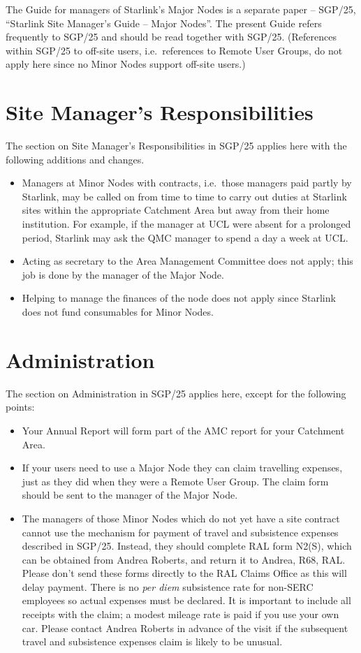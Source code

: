 The Guide for managers of Starlink's Major Nodes is a separate paper -- SGP/25,
``Starlink Site Manager's Guide -- Major Nodes''.
The present Guide refers frequently to SGP/25 and should be read together with
SGP/25.
(References within SGP/25 to off-site users, i.e.\ references to Remote User
Groups, do not apply here since no Minor Nodes support off-site users.)

\section {Site Manager's Responsibilities}

The section on Site Manager's Responsibilities in SGP/25 applies here
with the following additions and changes.
\begin{itemize}
\item Managers at Minor Nodes with contracts, i.e.\ those managers paid partly
by Starlink, may be called on from time to time to carry out duties at Starlink
sites within the appropriate Catchment Area but away from their home
institution.
For example, if the manager at UCL were absent for a prolonged period, Starlink
may ask the QMC manager to spend a day a week at UCL.
\item Acting as secretary to the Area Management Committee does not apply;
this job is done by the manager of the Major Node.
\item Helping to manage the finances of the node does not apply since
Starlink does not fund consumables for Minor Nodes.
\end{itemize}

\section {Administration}

The section on Administration in SGP/25 applies here, except for the following
points:
\begin{itemize}
\item Your Annual Report will form part of the AMC report for your Catchment
Area.
\item If your users need to use a Major Node they can claim travelling expenses,
just as they did when they were a Remote User Group.
The claim form should be sent to the manager of the Major Node.
\item The managers of those Minor Nodes which do not yet have a site contract
cannot use the mechanism for payment of travel and subsistence expenses
described in SGP/25.
Instead, they should complete RAL form N2(S), which can be obtained from
Andrea Roberts, and return it to Andrea, R68, RAL.
Please don't send these forms directly to the RAL Claims Office as this will
delay payment.
There is no {\it per diem} subsistence rate for non-SERC employees so actual
expenses must be declared.
It is important to include all receipts with the claim; a modest mileage rate
is paid if you use your own car.
Please contact Andrea Roberts in advance of the visit if the subsequent travel
and subsistence expenses claim is likely to be unusual.

\end{itemize}

